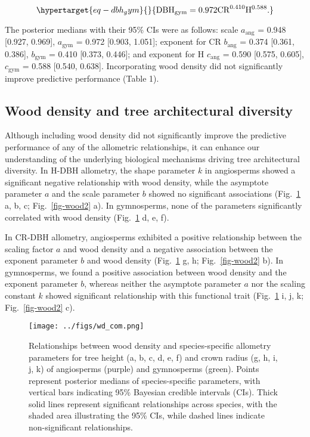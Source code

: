 \documentclass[
  12pt,
  letterpaper,
  DIV=11,
  numbers=noendperiod]{scrartcl}
\begin{document}
\begin{equation}\protect\hypertarget{eq-dbh_gym}{}{
\mathrm{DBH_{gym}} = \mathrm{0.972}
\mathrm{CR}^{\text{0.410}}
\mathrm{H}^{\text{0.588}}.
}\label{eq-dbh_gym}\end{equation}

The posterior medians with their 95\% CIs were as follows: scale
\(a_{\text{ang}}\) = 0.948 {[}0.927, 0.969{]}, \(a_{\text{gym}}\) =
0.972 {[}0.903, 1.051{]}; exponent for CR \(b_{\text{ang}}\) = 0.374
{[}0.361, 0.386{]}, \(b_{\text{gym}}\) = 0.410 {[}0.373, 0.446{]}; and
exponent for H \(c_{\text{ang}}\) = 0.590 {[}0.575, 0.605{]},
\(c_{\text{gym}}\) = 0.588 {[}0.540, 0.638{]}. Incorporating wood
density did not significantly improve predictive performance (Table 1).

\hypertarget{wood-density-and-tree-architectural-diversity}{%
\subsection{Wood density and tree architectural
diversity}\label{wood-density-and-tree-architectural-diversity}}

Although including wood density did not significantly improve the
predictive performance of any of the allometric relationships, it can
enhance our understanding of the underlying biological mechanisms
driving tree architectural diversity. In H-DBH allometry, the shape
parameter \(k\) in angiosperms showed a significant negative
relationship with wood density, while the asymptote parameter \(a\) and
the scale parameter \(b\) showed no significant associations
(Fig.~\ref{fig-wood1} a, b, c; Fig.~\ref{fig-wood2} a). In gymnosperms,
none of the parameters significantly correlated with wood density
(Fig.~\ref{fig-wood1} d, e, f).

In CR-DBH allometry, angiosperms exhibited a positive relationship
between the scaling factor \(a\) and wood density and a negative
association between the exponent parameter \(b\) and wood density
(Fig.~\ref{fig-wood1} g, h; Fig.~\ref{fig-wood2} b). In gymnosperms, we
found a positive association between wood density and the exponent
parameter \(b\), whereas neither the asymptote parameter \(a\) nor the
scaling constant \(k\) showed significant relationship with this
functional trait (Fig.~\ref{fig-wood1} i, j, k; Fig.~\ref{fig-wood2} c).

\begin{figure}[H]

{\centering \texttt{[image: ../figs/wd\_com.png]}

}

\caption{\label{fig-wood1}Relationships between wood density and
species-specific allometry parameters for tree height (a, b, c, d, e, f)
and crown radius (g, h, i, j, k) of angiosperms (purple) and gymnosperms
(green). Points represent posterior medians of species-specific
parameters, with vertical bars indicating 95\% Bayesian credible
intervals (CIs). Thick solid lines represent significant relationships
across species, with the shaded area illustrating the 95\% CIs, while
dashed lines indicate non-significant relationships.}

\end{figure}
\end{document}
